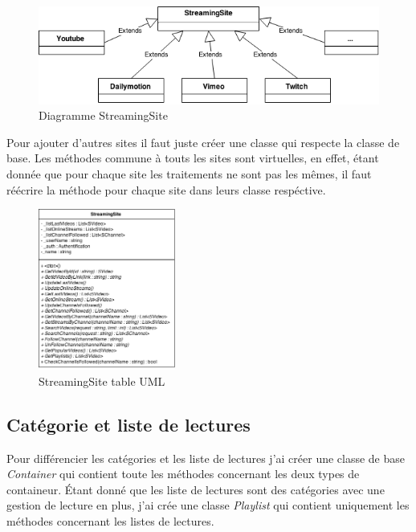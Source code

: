 \documentclass[11pt]{report} %
\begin{document}
			\begin{figure}[h]
				\center
				\includegraphics[width=1\textwidth]{../img/StreamingSite.png}
				\caption{Diagramme StreamingSite}
				\label{streaming site}
			\end{figure}
			
			Pour ajouter d'autres sites il faut juste créer une classe qui respecte la classe de base.
			Les méthodes commune à touts les sites sont virtuelles, en effet, étant donnée que pour chaque site les traitements ne sont pas les mêmes, il faut réécrire la méthode pour chaque site dans leurs classe respéctive.
			
			\begin{figure}[h]
				\center
				\includegraphics[width=0.4\textwidth]{../img/streamingsiteuml.png}
				\caption{StreamingSite table UML}
				\label{streaming site uml}
			\end{figure}
			
			\subsection{Catégorie et liste de lectures}
			Pour différencier les catégories et les liste de lectures j'ai créer une classe de base \textit{Container} qui contient toute les méthodes concernant les deux types de containeur.
			Étant donné que les liste de lectures sont des catégories avec une gestion de lecture en plus, j'ai crée une classe \textit{Playlist} qui contient uniquement les méthodes concernant les listes de lectures.
			
\end{document}
